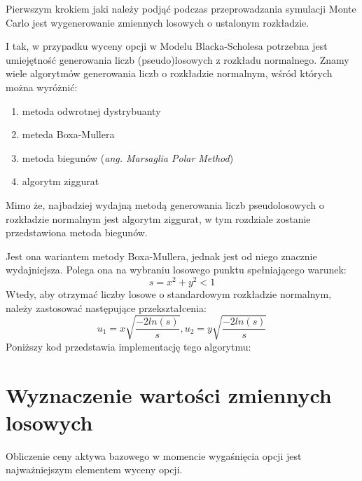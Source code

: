 \documentclass{pracamgr}
\begin{document}
Pierwszym krokiem jaki należy podjąć podczas przeprowadzania symulacji Monte Carlo jest 
wygenerowanie zmiennych losowych o ustalonym rozkładzie.

I tak, w przypadku wyceny opcji w Modelu Blacka-Scholesa potrzebna jest umiejętność generowania liczb (pseudo)losowych z rozkładu normalnego. Znamy wiele algorytmów generowania liczb o rozkładzie normalnym, wśród których można wyróżnić:
\begin{enumerate}
  \item metoda odwrotnej dystrybuanty
  \item meteda Boxa-Mullera
  \item metoda biegunów (\textit{ang. Marsaglia Polar Method})
  \item algorytm ziggurat
\end{enumerate}

Mimo że, najbadziej wydajną metodą generowania liczb pseudolosowych o rozkładzie normalnym jest algorytm ziggurat, w tym rozdziale zostanie przedstawiona metoda biegunów.

Jest ona wariantem metody Boxa-Mullera, jednak jest od niego znacznie wydajniejsza.
Polega ona na wybraniu losowego punktu spełniającego warunek:
\begin{equation}
  s = x^2 + y^2 < 1
\end{equation}
Wtedy, aby otrzymać liczby losowe o standardowym rozkładzie normalnym, należy zastosować następujące przekształcenia:
\begin{equation}
  u_1 = x \sqrt{\frac{-2ln(s)}{s}}, u_2 = y \sqrt{\frac{-2ln(s)}{s}}
\end{equation}
Poniższy kod przedstawia implementację tego algorytmu:


\section{Wyznaczenie wartości zmiennych losowych}

Obliczenie ceny aktywa bazowego w momencie wygaśnięcia opcji jest najważniejszym elementem 
wyceny opcji. 
\end{document}
